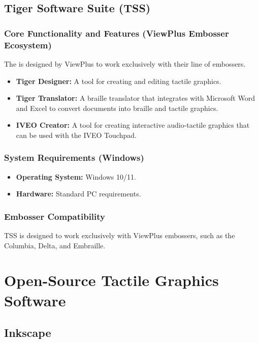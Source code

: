 \subsection{Tiger Software Suite (TSS)}\label{ch14:ssec:tss}
\subsubsection{Core Functionality and Features (ViewPlus Embosser Ecosystem)}\label{ch14:sssec:tss-features}
The  is designed by ViewPlus to work exclusively with their line of embossers.
\begin{itemize}
	\item \textbf{Tiger Designer:} A tool for creating and editing tactile graphics.
	\item \textbf{Tiger Translator:} A braille translator that integrates with Microsoft Word and Excel to convert documents into braille and tactile graphics.
	\item \textbf{IVEO Creator:} A tool for creating interactive audio-tactile graphics that can be used with the IVEO Touchpad.
\end{itemize}

\subsubsection{System Requirements (Windows)}\label{ch14:sssec:tss-sysreq}
\begin{itemize}
	\item \textbf{Operating System:} Windows 10/11.
	\item \textbf{Hardware:} Standard PC requirements.
\end{itemize}

\subsubsection{Embosser Compatibility}\label{ch14:sssec:tss-compat}
TSS is designed to work exclusively with ViewPlus embossers, such as the Columbia, Delta, and Embraille.

\section{Open-Source Tactile Graphics Software}\label{ch14:sec:open-source-software}
\subsection{Inkscape}\label{ch14:ssec:inkscape}

